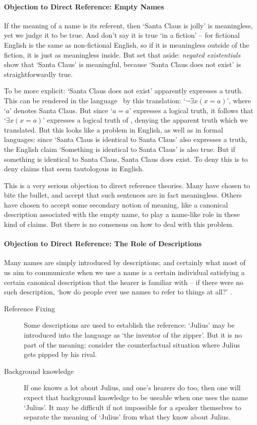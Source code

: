\paragraph{Objection to Direct Reference: Empty Names}
If the meaning of a name is its referent, then `Santa Claus is jolly' is meaningless, yet we judge it to be true. And don't say it is true `in a fiction' – for fictional English is the same as non-fictional English, so if it is meaningless outside of the fiction, it is just as meaningless inside. But set that aside: \emph{negated existentials} show that `Santa Claus' is meaningful, because `Santa Claus does not exist' is straightforwardly true.



To be more explicit: `Santa Claus does not exist' apparently expresses a truth. This can be rendered in the language \lequ\ by this translation: `$\neg \exists x (x= a)$', where `$a$' denotes Santa Claus. But since `$a=a$' expresses a logical truth, it follows that `$\exists x (x = a)$' expresses a logical truth of \lequ, denying the apparent truth which we translated. But this looks like a problem in English, as well as in formal languages: since `Santa Claus is identical to Santa Claus' also expresses a truth, the English claim `Something is identical to Santa Claus' is also true. But if something is identical to Santa Claus, Santa Claus does exist. To deny this is to deny claims that seem tautologous in English. 

This is a very serious objection to direct reference theories. Many have chosen to bite the bullet, and accept that such sentences are in fact meaningless. Others have chosen to accept some secondary notion of meaning, like a canonical description associated with the empty name, to play a name-like role in these kind of claims. But there is no consensus on how to deal with this problem.

\paragraph{Objection to Direct Reference: The Role of Descriptions}
Many names are simply introduced by descriptions; and certainly what most of us aim to communicate when we use a name is a certain individual satisfying a certain canonical description that the hearer is familiar with – if there were no such description, `how do people ever use names to refer to things at all?' \citep[28]{krinamne}. 
\begin{description}
	\item [Reference Fixing] Some descriptions are used to establish the reference: `Julius' may be introduced into the language as `the inventor of the zipper'. But it is no part of the meaning: consider the counterfactual situation where Julius gets pipped by his rival.
	\item [Background knowledge] If one knows a lot about Julius, and one's hearers do too, then one will expect that background knowledge to be useable when one uses the name `Julius'. It may be difficult if not impossible for a speaker themselves to separate the meaning of `Julius' from what they know about Julius.
\end{description}

